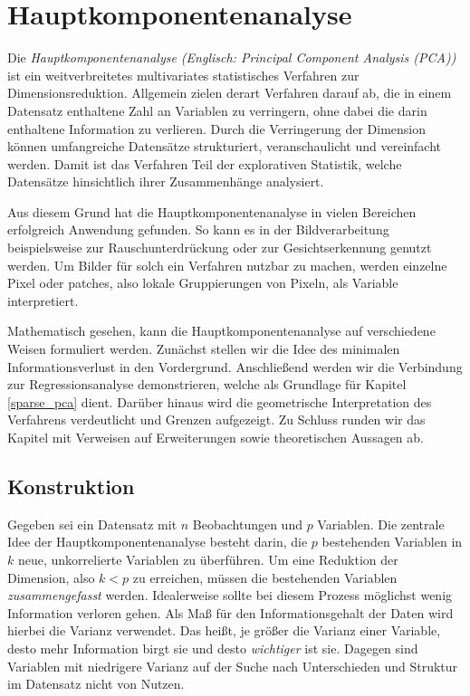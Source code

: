 \chapter{Hauptkomponentenanalyse}

\label{pca}

Die \textit{Hauptkomponentenanalyse (Englisch: Principal Component Analysis (PCA))} ist ein weitverbreitetes multivariates statistisches Verfahren zur Dimensionsreduktion. Allgemein zielen derart Verfahren darauf ab, die in einem Datensatz enthaltene Zahl an Variablen zu verringern, ohne dabei die darin enthaltene Information zu verlieren. Durch die Verringerung der Dimension können umfangreiche Datensätze strukturiert, veranschaulicht und vereinfacht werden. Damit ist das Verfahren Teil der explorativen Statistik, welche Datensätze hinsichtlich ihrer Zusammenhänge analysiert.

Aus diesem Grund hat die Hauptkomponentenanalyse in vielen Bereichen erfolgreich Anwendung gefunden. So kann es in der Bildverarbeitung beispielsweise zur Rauschunterdrückung \cite{babu} oder zur Gesichtserkennung \cite{jiang} genutzt werden. Um Bilder für solch ein Verfahren nutzbar zu machen, werden einzelne Pixel oder patches, also lokale Gruppierungen von Pixeln, als Variable interpretiert. 

Mathematisch gesehen, kann die Hauptkomponentenanalyse auf verschiedene Weisen formuliert werden. Zunächst stellen wir die Idee des minimalen Informationsverlust in den Vordergrund. Anschließend werden wir die Verbindung zur Regressionsanalyse demonstrieren, welche als Grundlage für Kapitel \ref{sparse_pca} dient. Darüber hinaus wird die geometrische Interpretation des Verfahrens verdeutlicht und Grenzen aufgezeigt. Zu Schluss runden wir das Kapitel mit Verweisen auf Erweiterungen sowie theoretischen Aussagen ab.




\section{Konstruktion}

Gegeben sei ein Datensatz mit $n$ Beobachtungen und $p$ Variablen. Die zentrale Idee der Hauptkomponentenanalyse besteht darin, die $p$ bestehenden Variablen in $k$ neue, unkorrelierte Variablen zu überführen. Um eine Reduktion der Dimension, also $k < p$ zu erreichen, müssen die bestehenden Variablen \textit{zusammengefasst} werden. Idealerweise sollte bei diesem Prozess möglichst wenig Information verloren gehen. Als Maß für den Informationsgehalt der Daten wird hierbei die Varianz verwendet. Das heißt, je größer die Varianz einer Variable, desto mehr Information birgt sie und desto \textit{wichtiger} ist sie. Dagegen sind Variablen mit niedrigere Varianz auf der Suche nach Unterschieden und Struktur im Datensatz nicht von Nutzen. 

